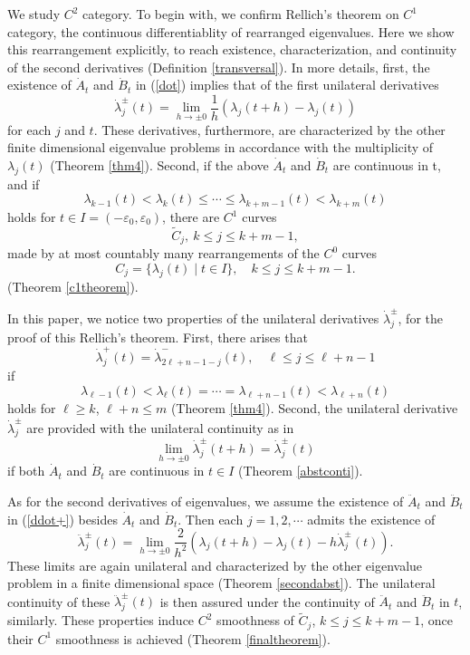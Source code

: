 \documentclass[final,a4paper]{jmsj}
\theoremstyle{thmstyleone}%
\theoremstyle{thmstyletwo}%
\theoremstyle{thmstylethree}%
\begin{document}
We study $C^2$ category. To begin with, we confirm Rellich's theorem on $C^1$ category, the continuous differentiablity of rearranged eigenvalues. Here we show this rearrangement explicitly, to reach existence, characterization, and continuity of the second derivatives (Definition \ref{transversal}). In more details, first, the existence of $\dot A_t$ and $\dot B_t$ in (\ref{dot}) implies that of the first unilateral derivatives  
\begin{equation} 
\dot \lambda^\pm_j(t)=\lim_{h\rightarrow \pm 0}\frac{1}{h}(\lambda_j(t+h)-\lambda_j(t)) 
 \label{unilateral}
\end{equation} 
for each $j$ and $t$. These derivatives, furthermore, are characterized by the other finite dimensional eigenvalue problems in accordance with the multiplicity of $\lambda_j(t)$ (Theorem \ref{thm4}).
Second, if the above $\dot A_t$ and $\dot B_t$ are continuous in t, and if 
\begin{equation} 
\lambda_{k-1}(t)<\lambda_k(t)\leq \cdots \leq \lambda_{k+m-1}(t)<\lambda_{k+m}(t) 
 \label{x19}
\end{equation} 
holds for $t\in I= (-\varepsilon_0, \varepsilon_0)$, there are $C^1$ curves  
\[ \tilde C_j, \ k\leq j\leq k+m-1, \] 
made by at most countably many rearrangements of the $C^0$ curves  
\[ C_j=\{ \lambda_j(t) \mid t\in I\}, \quad k\leq j\leq k+m-1. \] 
 (Theorem \ref{c1theorem}).  

In this paper, we notice two properties of the unilateral derivatives $\dot \lambda_j^\pm$, for the proof of this Rellich's theorem. First, there arises that 
\[ \dot \lambda_j^+(t)=\dot \lambda_{2\ell+n-1-j}^-(t), \quad \ell\leq j\leq \ell+n-1 \] 
if 
\begin{equation} 
\lambda_{\ell-1}(t)<\lambda_\ell(t)=\cdots = \lambda_{\ell+n-1}(t)<\lambda_{\ell+n}(t)   
 \label{18}
\end{equation} 
holds for $\ell \geq k$, $\ell+n\leq m$ (Theorem \ref{thm4}). Second, the unilateral derivative $\dot \lambda_j^\pm$ are provided with the unilateral continuity as in  
\[ \lim_{h\rightarrow \pm 0}\dot \lambda_j^\pm(t+h)=\dot \lambda_j^\pm(t) \] 
if both $\dot A_t$ and $\dot B_t$ are continuous in $t\in I$ (Theorem \ref{abstconti}). 

As for the second derivatives of eigenvalues, we assume the existence of $\ddot A_t$ and $\ddot B_t$ in (\ref{ddot+}) besides $\dot A_t$ and $\dot B_t$. Then each $j=1,2,\cdots$ admits the existence of
\begin{equation}    
\ddot \lambda_j^\pm(t)=\lim_{h\rightarrow \pm 0}\frac{2}{h^2}(\lambda_j(t+h)-\lambda_j(t)-h\dot \lambda_j^\pm(t)). 
 \label{18+}
\end{equation} 
These limits are again unilateral and characterized by the other eigenvalue problem in a finite dimensional space (Theorem \ref{secondabst}). The unilateral continuity of these $\ddot \lambda_j^\pm(t)$ is then assured under the continuity of $\ddot A_t$ and $\ddot B_t$ in $t$, similarly. These properties induce $C^2$ smoothness of $\tilde C_j$, $k\leq j\leq k+m-1$, once their $C^1$ smoothness is achieved (Theorem \ref{finaltheorem}). 
\end{document}

